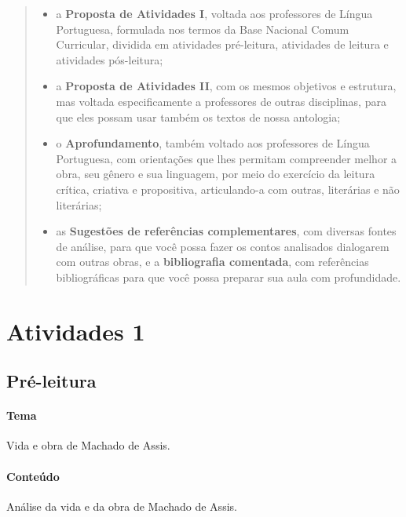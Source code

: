 \documentclass[12pt]{extarticle}
\begin{document}
\begin{abstract}
\begin{itemize}
\item
  a \textbf{Proposta de Atividades I}, voltada aos professores de Língua
  Portuguesa, formulada nos termos da Base Nacional Comum Curricular,
  dividida em atividades pré-leitura, atividades de leitura e atividades
  pós-leitura;
\item
  a \textbf{Proposta de Atividades II}, com os mesmos objetivos e
  estrutura, mas voltada especificamente a professores de outras
  disciplinas, para que eles possam usar também os textos de nossa
  antologia;
\item
  o \textbf{Aprofundamento}, também voltado aos professores de Língua
  Portuguesa, com orientações que lhes permitam compreender melhor a
  obra, seu gênero e sua linguagem, por meio do exercício da leitura
  crítica, criativa e propositiva, articulando-a com outras, literárias
  e não literárias;
\item
  as \textbf{Sugestões de referências complementares}, com diversas
  fontes de análise, para que você possa fazer os contos analisados
  dialogarem com outras obras, e a \textbf{bibliografia comentada}, com
  referências bibliográficas para que você possa preparar sua aula com
  profundidade.
\end{itemize}

\end{abstract}

\tableofcontents


\section{Atividades 1}

\subsection{Pré-leitura}

%

\paragraph{Tema} Vida e obra de Machado de Assis.

\paragraph{Conteúdo} Análise da vida e da obra de Machado de Assis.
\end{document}
